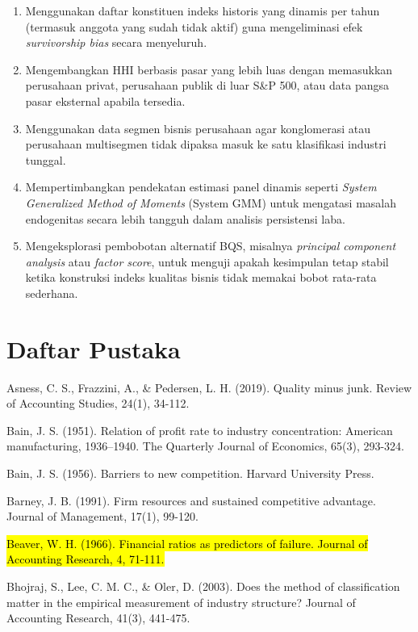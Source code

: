 \documentclass[12pt,a4paper]{article}
\providecommand{\tightlist}{%
  \setlength{\itemsep}{0pt}\setlength{\parskip}{0pt}%
}
\begin{document}
\begin{enumerate}
\def\labelenumi{\arabic{enumi}.}
\tightlist
\item
  Menggunakan daftar konstituen indeks historis yang dinamis per tahun
  (termasuk anggota yang sudah tidak aktif) guna mengeliminasi efek
  \emph{survivorship bias} secara menyeluruh.
\item
  Mengembangkan HHI berbasis pasar yang lebih luas dengan memasukkan
  perusahaan privat, perusahaan publik di luar S\&P 500, atau data
  pangsa pasar eksternal apabila tersedia.
\item
  Menggunakan data segmen bisnis perusahaan agar konglomerasi atau
  perusahaan multisegmen tidak dipaksa masuk ke satu klasifikasi
  industri tunggal.
\item
  Mempertimbangkan pendekatan estimasi panel dinamis seperti
  \emph{System Generalized Method of Moments} (System GMM) untuk
  mengatasi masalah endogenitas secara lebih tangguh dalam analisis
  persistensi laba.
\item
  Mengeksplorasi pembobotan alternatif BQS, misalnya \emph{principal
  component analysis} atau \emph{factor score}, untuk menguji apakah
  kesimpulan tetap stabil ketika konstruksi indeks kualitas bisnis tidak
  memakai bobot rata-rata sederhana.
\end{enumerate}

\section*{Daftar Pustaka}\label{daftar-pustaka}

Asness, C. S., Frazzini, A., \& Pedersen, L. H. (2019). Quality minus
junk. Review of Accounting Studies, 24(1), 34-112.

Bain, J. S. (1951). Relation of profit rate to industry concentration:
American manufacturing, 1936--1940. The Quarterly Journal of Economics,
65(3), 293-324.

Bain, J. S. (1956). Barriers to new competition. Harvard University
Press.

Barney, J. B. (1991). Firm resources and sustained competitive
advantage. Journal of Management, 17(1), 99-120.

\hl{Beaver, W. H. (1966). Financial ratios as predictors of failure. Journal of Accounting Research, 4, 71-111.}

Bhojraj, S., Lee, C. M. C., \& Oler, D. (2003). Does the method of
classification matter in the empirical measurement of industry
structure? Journal of Accounting Research, 41(3), 441-475.
\end{document}
